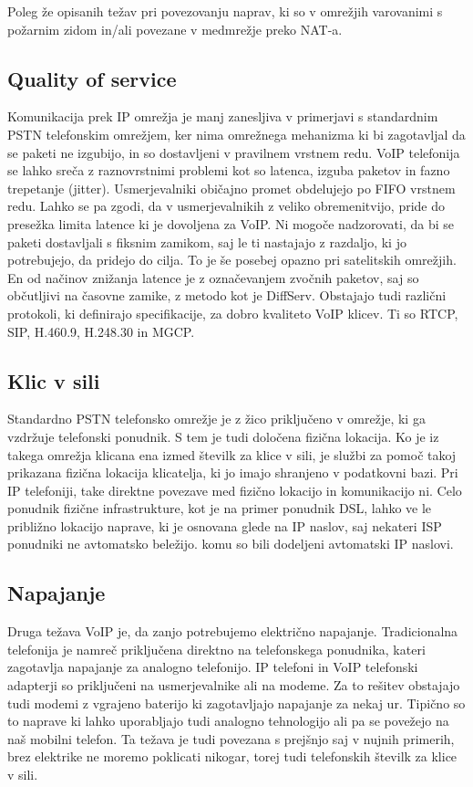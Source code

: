 \documentclass{acm_proc_article-sp}
\begin{document}
Poleg že opisanih težav pri povezovanju naprav, ki so v omrežjih varovanimi s požarnim zidom in/ali povezane v medmrežje preko NAT-a.

\subsection{Quality of service}
Komunikacija prek IP omrežja je manj zanesljiva v primerjavi s standardnim PSTN telefonskim omrežjem, ker nima omrežnega mehanizma ki bi zagotavljal da se paketi ne izgubijo, in so dostavljeni v pravilnem vrstnem redu. VoIP telefonija se lahko sreča z raznovrstnimi problemi kot so latenca, izguba paketov in fazno trepetanje (jitter).
Usmerjevalniki običajno promet obdelujejo po FIFO vrstnem redu. Lahko se pa zgodi, da v usmerjevalnikih z veliko obremenitvijo, pride do presežka limita latence ki je dovoljena za VoIP. Ni mogoče nadzorovati, da bi se paketi dostavljali s fiksnim zamikom, saj le ti nastajajo z razdaljo, ki jo potrebujejo, da pridejo do cilja. To je še posebej opazno pri satelitskih omrežjih. En od načinov znižanja latence je z označevanjem zvočnih paketov, saj so občutljivi na časovne zamike, z metodo kot je DiffServ. Obstajajo tudi različni protokoli, ki definirajo specifikacije, za dobro kvaliteto VoIP klicev. Ti so RTCP, SIP, H.460.9, H.248.30 in MGCP.

\subsection{Klic v sili}
Standardno PSTN telefonsko omrežje je z žico priključeno v omrežje, ki ga vzdržuje telefonski ponudnik. S tem je tudi določena fizična lokacija. Ko je iz takega omrežja klicana ena izmed številk za klice v sili, je službi za pomoč takoj prikazana fizična lokacija klicatelja, ki jo imajo shranjeno v podatkovni bazi. Pri IP telefoniji, take direktne povezave med fizično lokacijo in komunikacijo ni. Celo ponudnik fizične infrastrukture, kot je na primer ponudnik DSL, lahko ve le približno lokacijo naprave, ki je osnovana glede na IP naslov, saj nekateri ISP ponudniki ne avtomatsko beležijo. komu so bili  dodeljeni avtomatski IP naslovi.

\subsection{Napajanje}
Druga težava VoIP je, da zanjo potrebujemo električno napajanje. Tradicionalna telefonija je namreč priključena direktno na telefonskega ponudnika, kateri zagotavlja napajanje za analogno telefonijo. IP telefoni in VoIP telefonski adapterji so priključeni na usmerjevalnike ali na modeme. Za to rešitev obstajajo tudi modemi z vgrajeno baterijo ki zagotavljajo napajanje za nekaj ur. Tipično so to naprave ki lahko uporabljajo tudi analogno tehnologijo ali pa se povežejo na naš mobilni telefon. Ta težava je tudi povezana s prejšnjo saj v nujnih primerih, brez elektrike ne moremo poklicati nikogar, torej tudi telefonskih številk za klice v sili.
\end{document}
